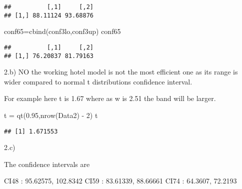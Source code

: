 \documentclass[
]{article}
\newenvironment{Shaded}{\begin{snugshade}}{\end{snugshade}}
\newcommand{\DecValTok}[1]{\textcolor[rgb]{0.00,0.00,0.81}{#1}}
\newcommand{\FloatTok}[1]{\textcolor[rgb]{0.00,0.00,0.81}{#1}}
\newcommand{\FunctionTok}[1]{\textcolor[rgb]{0.00,0.00,0.00}{#1}}
\newcommand{\NormalTok}[1]{#1}
\newcommand{\OtherTok}[1]{\textcolor[rgb]{0.56,0.35,0.01}{#1}}
\newcommand{\SpecialCharTok}[1]{\textcolor[rgb]{0.00,0.00,0.00}{#1}}
\begin{document}
\begin{verbatim}
##          [,1]     [,2]
## [1,] 88.11124 93.68876
\end{verbatim}

\begin{Shaded}
\begin{Highlighting}[]
\NormalTok{conf65}\OtherTok{=}\FunctionTok{cbind}\NormalTok{(conf3lo,conf3up)}
\NormalTok{conf65}
\end{Highlighting}
\end{Shaded}

\begin{verbatim}
##          [,1]     [,2]
## [1,] 76.20837 81.79163
\end{verbatim}

2.b) NO the working hotel model is not the most efficient one as its
range is wider compared to normal t distributions confidence interval.

For example here t is 1.67 where as w is 2.51 the band will be larger.

\begin{Shaded}
\begin{Highlighting}[]
\NormalTok{t }\OtherTok{=} \FunctionTok{qt}\NormalTok{(}\FloatTok{0.95}\NormalTok{,}\FunctionTok{nrow}\NormalTok{(Data2) }\SpecialCharTok{{-}} \DecValTok{2}\NormalTok{)}
\NormalTok{t}
\end{Highlighting}
\end{Shaded}

\begin{verbatim}
## [1] 1.671553
\end{verbatim}

2.c)

The confidence intervals are

CI48 : 95.62575, 102.8342 CI59 : 83.61339, 88.66661 CI74 : 64.3607,
72.2193
\end{document}
